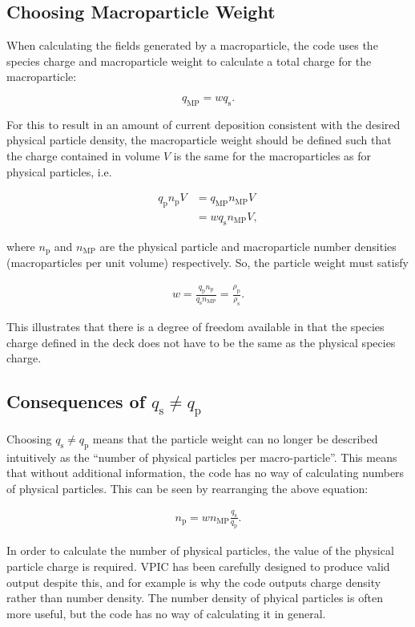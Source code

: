 \documentclass[twocolumn,10pt]{article}
\begin{document}
	\subsection{Choosing Macroparticle Weight}
	When calculating the fields generated by a macroparticle, the code uses the species charge and macroparticle weight to calculate a total charge for the macroparticle:

	\begin{equation}
		q_{\mathrm{MP}} = wq_{\mathrm{s}}.
	\end{equation}

	\noindent For this to result in an amount of current deposition consistent with the desired physical particle density, the macroparticle weight should be defined such that the charge contained in volume $V$ is the same for the macroparticles as for physical particles, i.e.

	\begin{align*}
		q_{\mathrm{p}}n_{\mathrm{p}}V &= q_{\mathrm{MP}}n_{\mathrm{MP}}V \\
			&= wq_{\mathrm{s}}n_{\mathrm{MP}}V,
	\end{align*}

	\noindent where $n_{\mathrm{p}}$ and $n_{\mathrm{MP}}$ are the physical particle and macroparticle number densities (macroparticles per unit volume) respectively. So, the particle weight must satisfy

	\begin{align}
		w = \frac{q_{\mathrm{p}}n_{\mathrm{p}}}{q_{\mathrm{s}}n_{\mathrm{MP}}} = \frac{\rho_{\mathrm{p}}}{\rho_{\mathrm{s}}}.
	\end{align}

	\noindent This illustrates that there is a degree of freedom available in that the species charge defined in the deck does not have to be the same as the physical species charge.

	\subsection{Consequences of $q_{\mathrm{s}} \neq q_{\mathrm{p}}$}

	Choosing $q_{\mathrm{s}} \neq q_{\mathrm{p}}$ means that the particle weight can no longer be described intuitively as the ``number of physical particles per macro-particle''. This means that without additional information, the code has no way of calculating numbers of physical particles. This can be seen by rearranging the above equation:

	\begin{align}
		n_{\mathrm{p}} = wn_{\mathrm{MP}}\frac{q_{\mathrm{s}}}{q_{\mathrm{p}}}.
	\end{align}

	\noindent In order to calculate the number of physical particles, the value of the physical particle charge is required. VPIC has been carefully designed to produce valid output despite this, and for example is why the code outputs charge density rather than number density. The number density of phyical particles is often more useful, but the code has no way of calculating it in general.
\end{document}
